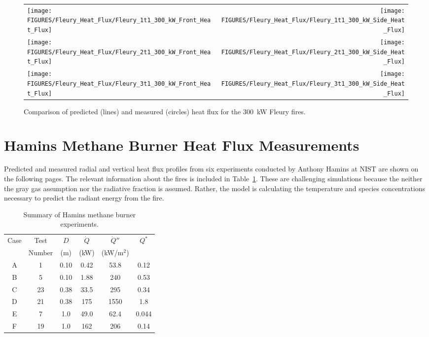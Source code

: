 \begin{figure}[p]
\begin{tabular*}{\textwidth}{l@{\extracolsep{\fill}}r}
\texttt{[image: FIGURES/Fleury\_Heat\_Flux/Fleury\_1t1\_300\_kW\_Front\_Heat\_Flux]} &
\texttt{[image: FIGURES/Fleury\_Heat\_Flux/Fleury\_1t1\_300\_kW\_Side\_Heat\_Flux]} \\
\texttt{[image: FIGURES/Fleury\_Heat\_Flux/Fleury\_2t1\_300\_kW\_Front\_Heat\_Flux]} &
\texttt{[image: FIGURES/Fleury\_Heat\_Flux/Fleury\_2t1\_300\_kW\_Side\_Heat\_Flux]} \\
\texttt{[image: FIGURES/Fleury\_Heat\_Flux/Fleury\_3t1\_300\_kW\_Front\_Heat\_Flux]} &
\texttt{[image: FIGURES/Fleury\_Heat\_Flux/Fleury\_3t1\_300\_kW\_Side\_Heat\_Flux]}
\end{tabular*}
\label{Fleury_Heat_Flux_300_kW}
\caption[Fleury Heat Flux, 300 kW fires.]
{Comparison of predicted (lines) and measured (circles) heat flux for the 300~kW Fleury fires.}
\end{figure}

\clearpage

\section{Hamins Methane Burner Heat Flux Measurements}

Predicted and measured radial and vertical heat flux profiles from six experiments conducted by Anthony Hamins at NIST are shown on the following pages. The relevant information about the fires is included in Table~\ref{Hamins_Table}. These are challenging simulations because the neither the gray gas assumption nor the radiative fraction is assumed. Rather, the model is calculating the temperature and species concentrations necessary to predict the radiant energy from the fire.

\begin{table}[ht]
\caption{Summary of Hamins methane burner experiments. }
\begin{center}
\begin{tabular}{|c|c|c|c|c|c|}
\hline
Case     & Test     & $D$  & $\dot{Q}$   &  $\dot{Q}''$   & $Q^*$   \\
         & Number   & (m)  & (kW)        &  (kW/m$^2$)    &         \\ \hline \hline
A        & 1        & 0.10 & 0.42        &  53.8          & 0.12    \\ \hline
B        & 5        & 0.10 & 1.88        &  240           & 0.53    \\ \hline
C        & 23       & 0.38 & 33.5        &  295           & 0.34    \\ \hline
D        & 21       & 0.38 & 175         &  1550          & 1.8     \\ \hline
E        & 7        & 1.0  & 49.0        &  62.4          & 0.044   \\ \hline
F        & 19       & 1.0  & 162         &  206           & 0.14    \\ \hline
\end{tabular}
\end{center}
\label{Hamins_Table}
\end{table}


